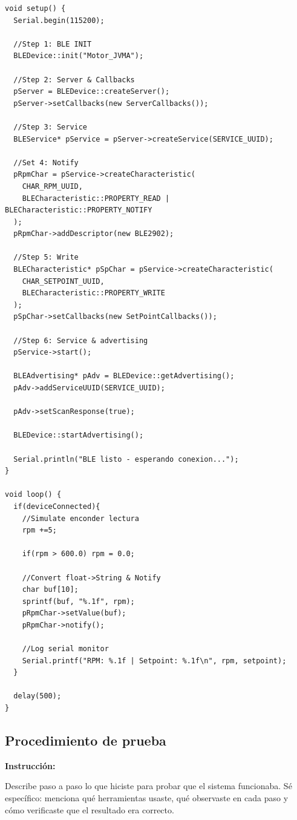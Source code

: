 \documentclass[12pt, letterpaper]{article}
\newenvironment{instruccion}{%
  \begin{mdframed}[
    backgroundcolor = tealLight,
    linecolor       = tealMain,
    linewidth       = 1pt,
    innerleftmargin = 10pt, innerrightmargin = 10pt,
    innertopmargin  = 6pt,  innerbottommargin= 6pt
  ]
  \small\color{tealMain}\textbf{Instrucción:}\hspace{4pt}\color{black}
}{%
  \end{mdframed}
}
\begin{document}
\begin{lstlisting}[caption={main.cpp — código fuente de la práctica}, label={lst:main}]
void setup() {
  Serial.begin(115200);

  //Step 1: BLE INIT
  BLEDevice::init("Motor_JVMA");

  //Step 2: Server & Callbacks
  pServer = BLEDevice::createServer();
  pServer->setCallbacks(new ServerCallbacks());

  //Step 3: Service
  BLEService* pService = pServer->createService(SERVICE_UUID);

  //Set 4: Notify
  pRpmChar = pService->createCharacteristic(
    CHAR_RPM_UUID,
    BLECharacteristic::PROPERTY_READ | BLECharacteristic::PROPERTY_NOTIFY
  );
  pRpmChar->addDescriptor(new BLE2902);

  //Step 5: Write
  BLECharacteristic* pSpChar = pService->createCharacteristic(
    CHAR_SETPOINT_UUID,
    BLECharacteristic::PROPERTY_WRITE
  );
  pSpChar->setCallbacks(new SetPointCallbacks());

  //Step 6: Service & advertising
  pService->start();

  BLEAdvertising* pAdv = BLEDevice::getAdvertising();
  pAdv->addServiceUUID(SERVICE_UUID);

  pAdv->setScanResponse(true);

  BLEDevice::startAdvertising();

  Serial.println("BLE listo - esperando conexion...");
}

void loop() {
  if(deviceConnected){
    //Simulate enconder lectura
    rpm +=5;

    if(rpm > 600.0) rpm = 0.0;

    //Convert float->String & Notify
    char buf[10];
    sprintf(buf, "%.1f", rpm);
    pRpmChar->setValue(buf);
    pRpmChar->notify();

    //Log serial monitor
    Serial.printf("RPM: %.1f | Setpoint: %.1f\n", rpm, setpoint);
  }

  delay(500);
}
\end{lstlisting}

\subsection{Procedimiento de prueba}

\begin{instruccion}
  Describe paso a paso lo que hiciste para probar que el sistema funcionaba.
  Sé específico: menciona qué herramientas usaste, qué observaste en cada paso
  y cómo verificaste que el resultado era correcto.
\end{instruccion}
\end{document}
